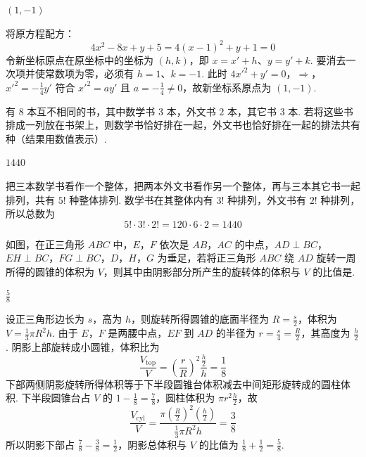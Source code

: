 \begin{answer}
\((1,-1)\)
\end{answer}

\begin{solution}
将原方程配方：
\[
4x^2-8x+y+5=4(x-1)^2+y+1=0
\]
令新坐标原点在原坐标中的坐标为 \((h,k)\)，即 \(x=x'+h\)、\(y=y'+k\). 要消去一次项并使常数项为零，必须有 \(h=1\)、\(k=-1\). 此时
\(4x'^2+y'=0\)，\(\Longrightarrow\)，\(x'^2=-\frac{1}{4}y'\)
符合 \(x'^2=ay'\) 且 \(a=-\frac{1}{4}\neq0\)，故新坐标系原点为 \((1,-1)\).
\end{solution}

\begin{problem}[A]
有 \(8\) 本互不相同的书，其中数学书 \(3\) 本，外文书 \(2\) 本，其它书 \(3\) 本. 若将这些书排成一列放在书架上，则数学书恰好排在一起，外文书也恰好排在一起的排法共有\fillinblank{}种（结果用数值表示）.
\end{problem}

\begin{answer}
\(1440\)
\end{answer}

\begin{solution}
把三本数学书看作一个整体，把两本外文书看作另一个整体，再与三本其它书一起排列，共有 \(5!\) 种整体排列. 数学书在其整体内有 \(3!\) 种排列，外文书有 \(2!\) 种排列，所以总数为
\[
5!\cdot3!\cdot2!=120\cdot6\cdot2=1440
\]
\end{solution}

\begin{problem}[A]
如图，在正三角形 \(ABC\) 中，\(E\)，\(F\) 依次是 \(AB\)，\(AC\) 的中点，\(AD \perp BC\)，\(EH \perp BC\)，\(FG \perp BC\)，\(D\)，\(H\)，\(G\) 为垂足，若将正三角形 \(ABC\) 绕 \(AD\) 旋转一周所得的圆锥的体积为 \(V\)，则其中由阴影部分所产生的旋转体的体积与 \(V\) 的比值是\fillinblank{}.

\end{problem}

\begin{answer}
\(\frac{5}{8}\)
\end{answer}

\begin{solution}
设正三角形边长为 \(s\)，高为 \(h\)，则旋转所得圆锥的底面半径为 \(R=\frac{s}{2}\)，体积为 \(V=\frac{1}{3}\pi R^2h\). 由于 \(E\)，\(F\) 是两腰中点，\(EF\) 到 \(AD\) 的半径为 \(r=\frac{s}{4}=\frac{R}{2}\)，其高度为 \(\frac{h}{2}\). 阴影上部旋转成小圆锥，体积比为
\[
\frac{V_{\mathrm{top}}}{V}=\left(\frac{r}{R}\right)^2\frac{\frac{h}{2}}{h}=\frac{1}{8}
\]
下部两侧阴影旋转所得体积等于下半段圆锥台体积减去中间矩形旋转成的圆柱体积. 下半段圆锥台占 \(V\) 的 \(1-\frac18=\frac78\)，圆柱体积为 \(\pi r^2\frac{h}{2}\)，故
\[
\frac{V_{\mathrm{cyl}}}{V}=\frac{\pi(\frac{R}{2})^2(\frac{h}{2})}{\frac13\pi R^2h}=\frac38
\]
所以阴影下部占 \(\frac78-\frac38=\frac12\)，阴影总体积与 \(V\) 的比值为 \(\frac18+\frac12=\frac58\).
\end{solution}

